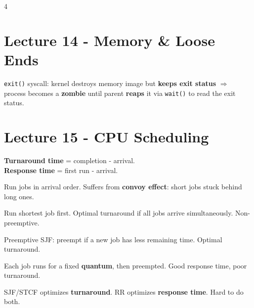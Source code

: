 \documentclass[8pt,a4paper,landscape]{extarticle}
\begin{document}
\begin{multicols*}{4}
\section{Lecture 14 - Memory \& Loose Ends}

\begin{prop}[title=End of a process]
    \texttt{exit()} syscall: kernel destroys memory image but \textbf{keeps exit status} $\Rightarrow$ process becomes a \textbf{zombie} until parent \textbf{reaps} it via \texttt{wait()} to read the exit status.
\end{prop}

\section{Lecture 15 - CPU Scheduling}

\begin{defn}[title=Scheduling Metrics]
    \textbf{Turnaround time} = completion - arrival. \\\textbf{Response time} = first run - arrival.
\end{defn}

\begin{defn}[title=FIFO]
    Run jobs in arrival order. Suffers from \textbf{convoy effect}: short jobs stuck behind long ones.
\end{defn}

\begin{defn}[title=SJF (Shortest Job First)]
    Run shortest job first. Optimal turnaround if all jobs arrive simultaneously. Non-preemptive.
\end{defn}

\begin{defn}[title=STCF (Shortest Time-to-Completion First)]
    Preemptive SJF: preempt if a new job has less remaining time. Optimal turnaround.
\end{defn}

\begin{defn}[title=Round Robin (RR)]
    Each job runs for a fixed \textbf{quantum}, then preempted. Good response time, poor turnaround.
\end{defn}

\begin{warn}[title=Tradeoff]
    SJF/STCF optimizes \textbf{turnaround}. RR optimizes \textbf{response time}. Hard to do both.
\end{warn}


\end{multicols*}
\end{document}
